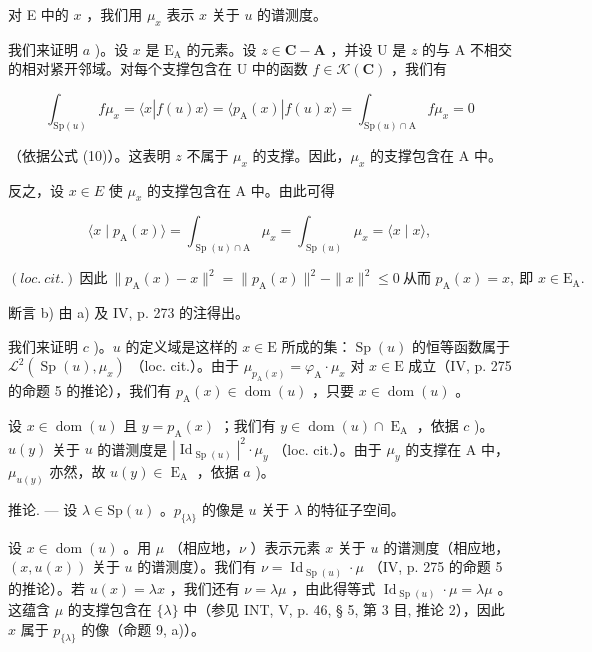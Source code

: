 对 E 中的 \(x\) ，我们用 \(\mu_x\) 表示 \(x\) 关于 \(u\) 的谱测度。

我们来证明 \(a\) )。设 \(x\) 是 \(\mathrm{E}_{\mathrm{A}}\) 的元素。设 \(z \in \mathbf{C} - \mathbf{A}\) ，并设 U 是 \(z\) 的与 A 不相交的相对紧开邻域。对每个支撑包含在 U 中的函数 \(f \in \mathcal{K}(\mathbf{C})\) ，我们有

\[
\int_ {\mathrm{Sp} (u)} f \mu_ {x} = \langle x | f (u) x \rangle = \langle p _ {\mathrm{A}} (x) | f (u) x \rangle = \int_ {\mathrm{Sp} (u) \cap \mathrm{A}} f \mu_ {x} = 0
\]

（依据公式 (10)）。这表明 \(z\) 不属于 \(\mu_x\) 的支撑。因此，\(\mu_x\) 的支撑包含在 A 中。

反之，设 \(x \in E\) 使 \(\mu_{x}\) 的支撑包含在 A 中。由此可得

\[
\langle x \mid p _ {\mathrm{A}} (x) \rangle = \int_ {\operatorname{Sp} (u) \cap \mathrm{A}} \mu_ {x} = \int_ {\operatorname{Sp} (u)} \mu_ {x} = \langle x \mid x \rangle ,
\]

\((loc. \ cit.) \ \text{因此} \ \|p_{\mathrm{A}}(x)-x\|^{2} = \|p_{\mathrm{A}}(x)\|^{2} - \|x\|^{2} \leqslant 0 \ \text{从而 } p_{\mathrm{A}}(x) = x, \ \text{即 } x \in \mathrm{E}_{\mathrm{A}}.\)

断言 b) 由 a) 及 IV, p. 273 的注得出。

我们来证明 \(c\) )。\(u\) 的定义域是这样的 \(x \in \mathrm{E}\) 所成的集：\(\operatorname{Sp}(u)\) 的恒等函数属于 \(\mathcal{L}^2(\operatorname{Sp}(u), \mu_x)\) （loc. cit.）。由于 \(\mu_{p_{\mathrm{A}}(x)} = \varphi_{\mathrm{A}} \cdot \mu_x\) 对 \(x \in \mathrm{E}\) 成立（IV, p. 275 的命题 5 的推论），我们有 \(p_{\mathrm{A}}(x) \in \operatorname{dom}(u)\) ，只要 \(x \in \operatorname{dom}(u)\) 。

设 \(x \in \operatorname{dom}(u)\) 且 \(y = p_{\operatorname{A}}(x)\) ；我们有 \(y \in \operatorname{dom}(u) \cap \operatorname{E}_{\operatorname{A}}\) ，依据 \(c\) )。\(u(y)\) 关于 \(u\) 的谱测度是 \(|\operatorname{Id}_{\operatorname{Sp}(u)}|^2 \cdot \mu_y\) （loc. cit.）。由于 \(\mu_y\) 的支撑在 A 中，\(\mu_{u(y)}\) 亦然，故 \(u(y) \in \operatorname{E}_{\operatorname{A}}\) ，依据 \(a\) )。

推论. --- 设 \(\lambda \in \mathrm{Sp}(u)\) 。\(p_{\{\lambda\}}\) 的像是 \(u\) 关于 \(\lambda\) 的特征子空间。

设 \(x \in \operatorname{dom}(u)\) 。用 \(\mu\) （相应地，\(\nu\) ）表示元素 \(x\) 关于 \(u\) 的谱测度（相应地，\((x, u(x))\) 关于 \(u\) 的谱测度）。我们有 \(\nu = \operatorname{Id}_{\operatorname{Sp}(u)} \cdot \mu\) （IV, p. 275 的命题 5 的推论）。若 \(u(x) = \lambda x\) ，我们还有 \(\nu = \lambda \mu\) ，由此得等式 \(\operatorname{Id}_{\operatorname{Sp}(u)} \cdot \mu = \lambda \mu\) 。这蕴含 \(\mu\) 的支撑包含在 \(\{\lambda\}\) 中（参见 INT, V, p. 46, § 5, 第 3 目, 推论 2），因此 \(x\) 属于 \(p_{\{\lambda\}}\) 的像（命题 9, a)）。

